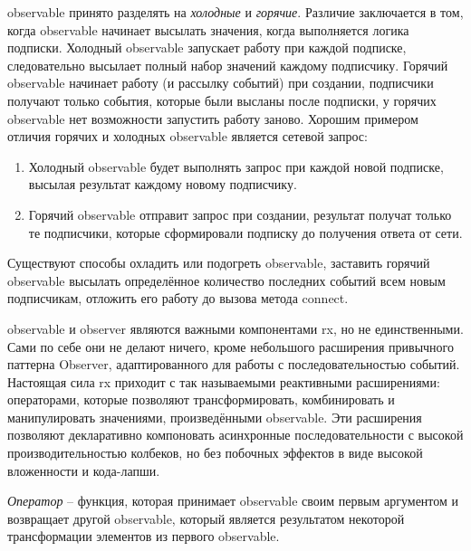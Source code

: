 \gls{observable} принято разделять на \emph{холодные} и \emph{горячие}. Различие заключается в том, когда \gls{observable} начинает высылать значения, когда выполняется логика подписки. Холодный \gls{observable} запускает работу при каждой подписке, следовательно высылает полный набор значений каждому подписчику. Горячий \gls{observable} начинает работу (и рассылку событий) при создании, подписчики получают только события, которые были высланы после подписки, у горячих \gls{observable} нет возможности запустить работу заново. Хорошим примером отличия горячих и холодных \gls{observable} является сетевой запрос:

\begin{enumerate}
	\item Холодный \gls{observable} будет выполнять запрос при каждой новой подписке, высылая результат каждому новому подписчику.
	\item Горячий \gls{observable} отправит запрос при создании, результат получат только те подписчики, которые сформировали подписку до получения ответа от сети.
\end{enumerate}

Существуют способы охладить или подогреть \gls{observable}, заставить горячий \gls{observable} высылать определённое количество последних событий всем новым подписчикам, отложить его работу до вызова метода connect.

\gls{observable} и observer являются важными компонентами \gls{rx}, но не единственными. Сами по себе они не делают ничего, кроме небольшого расширения привычного паттерна Observer, адаптированного для работы с последовательностью событий. Настоящая сила \gls{rx} приходит с так называемыми реактивными расширениями: операторами, которые позволяют трансформировать, комбинировать и манипулировать значениями, произведёнными \gls{observable}. Эти расширения позволяют декларативно компоновать асинхронные последовательности с высокой производительностью колбеков, но без побочных эффектов в виде высокой вложенности и кода-лапши.

\emph{Оператор} -- функция, которая принимает \gls{observable} своим первым аргументом и возвращает другой \gls{observable}, который является результатом некоторой трансформации элементов из первого \gls{observable}.